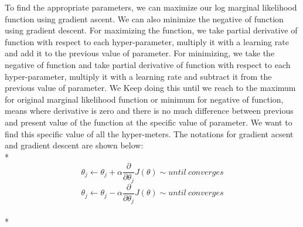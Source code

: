\documentclass{article}
\begin{document}
To find the appropriate parameters, we can maximize our log marginal likelihood function using gradient ascent. We can also minimize the negative of function using gradient descent. For maximizing the function, we take partial derivative of function with respect to each hyper-parameter, multiply it with a learning rate and add it to the previous value of parameter. For minimizing, we take the negative of function and take partial derivative of function with respect to each hyper-parameter, multiply it with a learning rate and subtract it from the previous value of parameter.  We Keep doing this until we reach to the maximum for original marginal likelihood function or minimum for negative of function, means where derivative is zero and there is no much difference between previous and present value of the function at the specific value of parameter. We want to find this specific value of all the hyper-meters. The notations for gradient acsent and gradient descent are shown below:
\\*
$$\theta_j \leftarrow \theta_j+\alpha \frac{\partial}{\partial \theta_{j}} J(\theta)\sim until \ converges$$ 
$$\theta_j \leftarrow \theta_j-\alpha \frac{\partial}{\partial \theta_{j}} J(\theta)\sim until \ converges$$
\\*
\end{document}
